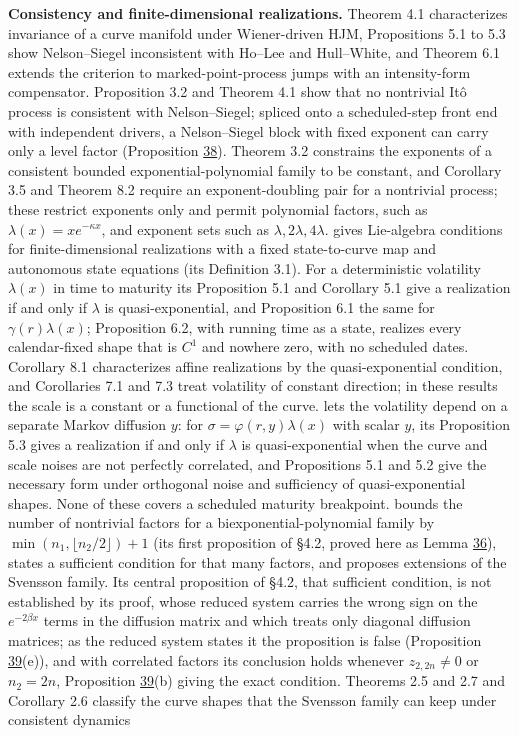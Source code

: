 \documentclass[11pt]{article}
\begin{document}
\textbf{Consistency and finite-dimensional realizations.} \cite{bjork1999interest} Theorem 4.1 characterizes invariance of a curve manifold under Wiener-driven HJM, Propositions 5.1 to 5.3 show Nelson--Siegel inconsistent with Ho--Lee and Hull--White, and Theorem 6.1 extends the criterion to marked-point-process jumps with an intensity-form compensator. \cite{filipovic1999note} Proposition 3.2 and Theorem 4.1 show that no nontrivial Itô process is consistent with Nelson--Siegel; spliced onto a scheduled-step front end with independent drivers, a Nelson--Siegel block with fixed exponent can carry only a level factor (Proposition \hyperref[res:Proposition-38]{38}). \cite{filipovic2000exponential} Theorem 3.2 constrains the exponents of a consistent bounded exponential-polynomial family to be constant, and Corollary 3.5 and Theorem 8.2 require an exponent-doubling pair for a nontrivial process; these restrict exponents only and permit polynomial factors, such as \(\lambda(x)=xe^{-\kappa x}\), and exponent sets such as \(\lambda,2\lambda,4\lambda\). \cite{bjork2001existence} gives Lie-algebra conditions for finite-dimensional realizations with a fixed state-to-curve map and autonomous state equations (its Definition 3.1). For a deterministic volatility \(\lambda(x)\) in time to maturity its Proposition 5.1 and Corollary 5.1 give a realization if and only if \(\lambda\) is quasi-exponential, and Proposition 6.1 the same for \(\gamma(r)\lambda(x)\); Proposition 6.2, with running time as a state, realizes every calendar-fixed shape that is \(C^1\) and nowhere zero, with no scheduled dates. \cite{tappe2010alternative} Corollary 8.1 characterizes affine realizations by the quasi-exponential condition, and Corollaries 7.1 and 7.3 treat volatility of constant direction; in these results the scale is a constant or a functional of the curve. \cite{bjork2004finite} lets the volatility depend on a separate Markov diffusion \(y\): for \(\sigma=\varphi(r,y)\lambda(x)\) with scalar \(y\), its Proposition 5.3 gives a realization if and only if \(\lambda\) is quasi-exponential when the curve and scale noises are not perfectly correlated, and Propositions 5.1 and 5.2 give the necessary form under orthogonal noise and sufficiency of quasi-exponential shapes. None of these covers a scheduled maturity breakpoint. \cite{sharef2004conditions} bounds the number of nontrivial factors for a biexponential-polynomial family by \(\min(n_1,\lfloor n_2/2\rfloor)+1\) (its first proposition of §4.2, proved here as Lemma \hyperref[res:Lemma-36]{36}), states a sufficient condition for that many factors, and proposes extensions of the Svensson family. Its central proposition of §4.2, that sufficient condition, is not established by its proof, whose reduced system carries the wrong sign on the \(e^{-2\beta x}\) terms in the diffusion matrix and which treats only diagonal diffusion matrices; as the reduced system states it the proposition is false (Proposition \hyperref[res:Proposition-39]{39}(e)), and with correlated factors its conclusion holds whenever \(z_{2,2n}\neq0\) or \(n_2=2n\), Proposition \hyperref[res:Proposition-39]{39}(b) giving the exact condition. \cite{kellerressel2024term} Theorems 2.5 and 2.7 and Corollary 2.6 classify the curve shapes that the Svensson family can keep under consistent dynamics 
\end{document}

